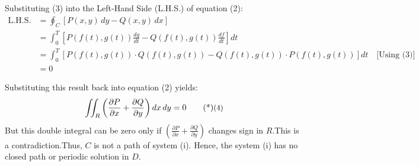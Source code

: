 \noindent Substituting (3) into the Left-Hand Side (L.H.S.) of equation (2):
\begin{align*}
    \text{L.H.S. of (2)} &= \oint_C \left[ P(x, y) \, dy - Q(x, y) \, dx \right] \\[0.5em]
    &= \int_0^T \left[ P(f(t), g(t)) \frac{dg}{dt} - Q(f(t), g(t)) \frac{df}{dt} \right] dt \\[0.5em]
    &= \int_0^T \left[ P(f(t), g(t)) \cdot Q(f(t), g(t)) - Q(f(t), g(t)) \cdot P(f(t), g(t)) \right] dt \quad \text{[Using (3)]} \\[0.5em]
    &= 0
\end{align*}

\noindent Substituting this result back into equation (2) yields:
\begin{equation}
    \iint_R \left( \frac{\partial P}{\partial x} + \frac{\partial Q}{\partial y} \right) dx \, dy = 0 \sidenote{4}
\end{equation}
But this double integral can be zero only if $\left( \frac{\partial P}{\partial x} + \frac{\partial Q}{\partial y} \right)$ changes sign in $R$.This is a contradiction.Thus, $C$ is not a path of system (i). Hence, the system (i) has no closed path or periodic solution in $D$.